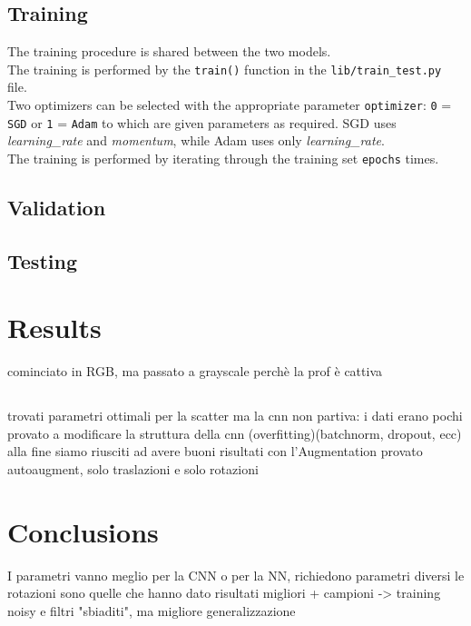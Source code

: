 \documentclass{report}
\begin{document}
\section{Training}
The training procedure is shared between the two models. \\
The training is performed by the \texttt{train()} function in the \texttt{lib/train\_test.py} file. \\

Two optimizers can be selected with the appropriate parameter \texttt{optimizer}: \texttt{0} = \texttt{SGD} or \texttt{1} = \texttt{Adam} to which are given parameters
as required. SGD uses \textit{learning\_rate} and \textit{momentum}, while Adam uses only \textit{learning\_rate}. \\
The training is performed by iterating through the training set \texttt{epochs} times. \\


\section{Validation}
\section{Testing}

\chapter{Results}
cominciato in RGB, ma passato a grayscale perchè la prof è cattiva
\section{}
trovati parametri ottimali per la scatter
ma la cnn non partiva: i dati erano pochi
provato a modificare la struttura della cnn (overfitting)(batchnorm, dropout, ecc)
alla fine siamo riusciti ad avere buoni risultati con l'Augmentation
provato autoaugment, solo traslazioni e solo rotazioni

\chapter{Conclusions}
I parametri vanno meglio per la CNN o per la NN, richiedono parametri diversi
le rotazioni sono quelle che hanno dato risultati migliori
+ campioni -> training noisy e filtri "sbiaditi", ma migliore generalizzazione
\end{document}
